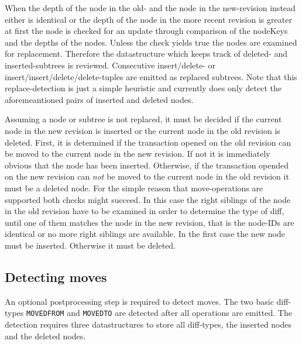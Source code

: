 When the depth of the node in the old- and the node in the new-revision instead either is identical or the depth of the node in the more recent revision is greater at first the node is checked for an update through comparison of the nodeKeys and the depths of the nodes. Unless the check yields true the nodes are examined for replacement. Therefore the datastructure which keeps track of deleted- and inserted-subtrees is reviewed. Consecutive insert/delete- or insert/insert/delete/delete-tuples are emitted as replaced subtrees. Note that this replace-detection is just a simple heuristic and currently does only detect the aforemeantioned pairs of inserted and deleted nodes.%

Assuming a node or subtree is not replaced, it must be decided if the current node in the new revision is inserted or the current node in the old revision is deleted. First, it is determined if the transaction opened on the old revision can be moved to the current node in the new revision. If not it is immediately obvious that the node has been inserted. Otherwise, if the transaction opended on the new revision can \emph{not} be moved to the current node in the old revision it must be a deleted node. For the simple reason that move-operations are supported both checks might succeed. In this case the right siblings of the node in the old revision have to be examined in order to determine the type of diff, until one of them matches the node in the new revision, that is the node-IDs are identical or no more right siblings are available. In the first case the new node must be inserted. Otherwise it must be deleted.

\subsection{Detecting moves}
An optional postprocessing step is required to detect moves. The two basic diff-types \texttt{MOVEDFROM} and \texttt{MOVEDTO} are detected after all operations are emitted. The detection requires three datastructures to store all diff-types, the inserted nodes and the deleted nodes.

